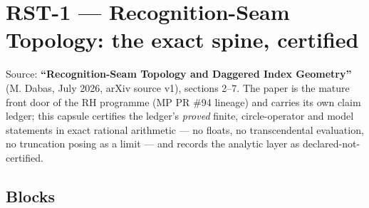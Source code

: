 \hypertarget{rst-1-recognition-seam-topology-the-exact-spine-certified}{%
\chapter{RST-1 --- Recognition-Seam Topology: the exact spine, certified}\label{rst-1-recognition-seam-topology-the-exact-spine-certified}}

Source: \textbf{``Recognition-Seam Topology and Daggered Index Geometry''}
(M. Dabas, July 2026, arXiv source v1), sections 2--7. The paper is the
mature front door of the RH programme (MP PR \#94 lineage) and carries its
own claim ledger; this capsule certifies the ledger's \emph{proved} finite,
circle-operator and model statements in exact rational arithmetic --- no
floats, no transcendental evaluation, no truncation posing as a limit ---
and records the analytic layer as declared-not-certified.

\hypertarget{blocks}{%
\section{Blocks}\label{blocks}}

